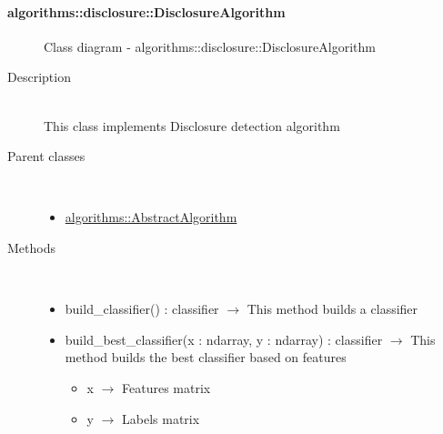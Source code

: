 \hypertarget{algorithms::disclosure::DisclosureAlgorithm}{}
\paragraph[DisclosureAlgorithm]{algorithms::disclosure::DisclosureAlgorithm}
 \hfill\begin{figure}[h]
\centering
{}
\caption{Class diagram - algorithms::disclosure::DisclosureAlgorithm}
\end{figure}\begin{description}
\item[Description] \hfill \\
 This class implements Disclosure detection algorithm
\item[Parent classes] \hfill \\
 \vspace{-1cm}
\begin{itemize}
\item \hyperlink{algorithms::AbstractAlgorithm}{algorithms::AbstractAlgorithm}
\end{itemize}

\item[Methods] \hfill \\
 \vspace{-1cm}
\begin{itemize}
\item build\_classifier() : classifier $\rightarrow$ This method builds a classifier
\item build\_best\_classifier(x : ndarray, y : ndarray) : classifier $\rightarrow$ This method builds the best classifier based on features\begin{itemize}
\item x $\rightarrow$ Features matrix
\item y $\rightarrow$ Labels matrix
\end{itemize}


\end{itemize}
\end{description}
